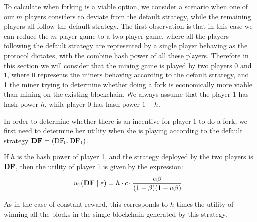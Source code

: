 To calculate when forking is a viable option, we consider a scenario when one of our $m$ players considers to deviate from the default strategy, while the remaining players all follow the default strategy. 
The first observation is that in this case we can reduce the $m$ player game to a two player game, where all the players following the default strategy are represented by a single player behaving as the protocol dictates, with the combine hash power of all these players. Therefore  in this section we will consider that the mining game is played by two players 0 and 1, where 0 represents the miners behaving according to the default strategy, and 1 the miner trying to determine whether doing a fork is economically more viable than mining on the existing blockchain. We always assume that the player 1 has hash power $h$, while player 0 has hash power $1-h$.

In order to determine whether there is an incentive for player 1 to do a fork, we first need to determine her utility when she is playing according to the default strategy $\text{\rm {\bf DF}} = (\text{\rm DF}_0,\text{\rm DF}_1)$. 

\begin{lemma}\label{lem:default_utility}
If $h$ is the hash power of player 1, and the strategy deployed by the two players is $\text{\rm {\bf DF}}$, then the utility of player 1 is given by the expression:
$$u_1(\text{\rm {\bf DF}}\mid\varepsilon) = h\cdot c\cdot\frac{\alpha\beta}{(1-\beta)(1-\alpha\beta)}.$$
\end{lemma}

As in the case of constant reward, this corresponds to $h$ times the utility of winning all the blocks in the single blockchain generated by this strategy.



